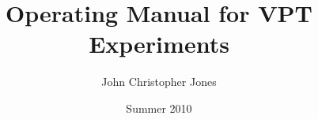 \documentclass[10pt, onecolumn, oneside, article, letterpaper]{memoir}
\title{Operating Manual for VPT Experiments}
\author{John Christopher Jones}
\date{Summer 2010}
\begin{document}





\mainmatter





















\printglossaries



\backmatter
\end{document}
